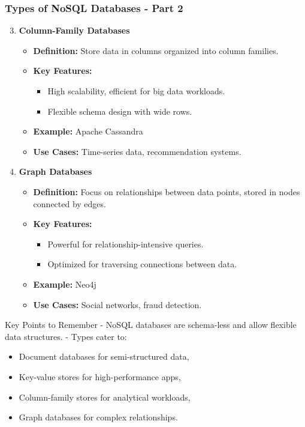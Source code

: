 \documentclass[aspectratio=169]{beamer}
\begin{document}
\begin{frame}[fragile]
  \frametitle{Types of NoSQL Databases - Part 2}
  \begin{enumerate}
    \setcounter{enumi}{2} %
    \item \textbf{Column-Family Databases}
      \begin{itemize}
        \item \textbf{Definition:} Store data in columns organized into column families.
        \item \textbf{Key Features:}
          \begin{itemize}
            \item High scalability, efficient for big data workloads.
            \item Flexible schema design with wide rows.
          \end{itemize}
        \item \textbf{Example:} Apache Cassandra
        \item \textbf{Use Cases:} Time-series data, recommendation systems.
      \end{itemize}
    
    \item \textbf{Graph Databases}
      \begin{itemize}
        \item \textbf{Definition:} Focus on relationships between data points, stored in nodes connected by edges.
        \item \textbf{Key Features:}
          \begin{itemize}
            \item Powerful for relationship-intensive queries.
            \item Optimized for traversing connections between data.
          \end{itemize}
        \item \textbf{Example:} Neo4j
        \item \textbf{Use Cases:} Social networks, fraud detection.
      \end{itemize}
  \end{enumerate}
  
  \begin{block}{Key Points to Remember}
    - NoSQL databases are schema-less and allow flexible data structures.
    - Types cater to:
      \begin{itemize}
        \item Document databases for semi-structured data,
        \item Key-value stores for high-performance apps,
        \item Column-family stores for analytical workloads,
        \item Graph databases for complex relationships.
      \end{itemize}
  \end{block}
\end{frame}
\end{document}
